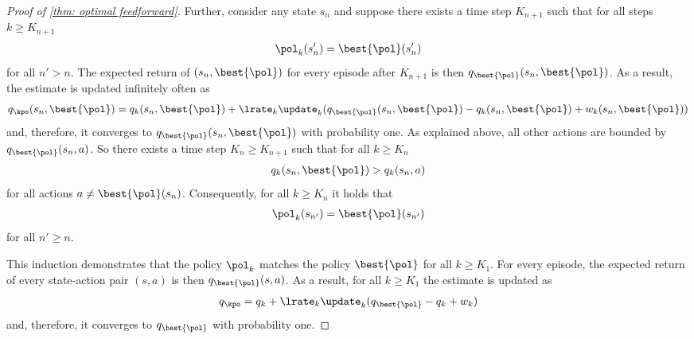 \begin{proof}[Proof of \autoref{thm: optimal feedforward}]
Further, consider any state $s_n$ and suppose there exists a time step $K_{n+1}$ such that for all steps $k \geq K_{n+1}$
\begin{align*}
    \pol_k(s_n') = \best{\pol}(s_n')
\end{align*}
for all $n'>n$.
The expected return of $(s_n, \best{\pol})$ for every episode after $K_{n+1}$ is then $q_{\best{\pol}}(s_n, \best{\pol})$. As a result, the estimate is updated infinitely often as
\begin{align*}
    q_\kpo(s_n, \best{\pol})
    =
    q_k(s_n, \best{\pol})
    + \lrate_k \update_k ( q_{\best{\pol}}(s_n, \best{\pol}) - q_k(s_n, \best{\pol}) + w_k(s_n, \best{\pol}) ) 
\end{align*}
and, therefore, it converges to $q_{\best{\pol}}(s_n, \best{\pol})$ with probability one.
As explained above, all other actions are bounded by $q_{\best{\pol}}(s_n, a)$.
So there exists a time step $K_n \geq K_{n+1}$ such that for all $k \geq K_n$
\begin{align*}
    q_k(s_n, \best{\pol}) 
    > q_k(s_n, a) 
\end{align*}
for all actions $a \neq \best{\pol}(s_n)$.
Consequently, for all $k \geq K_n$ it holds that
\begin{align*}
    \pol_k(s_{n'}) = \best{\pol}(s_{n'})
\end{align*}
for all $n' \geq n$.

This induction demonstrates that the policy $\pol_k$ matches the policy $\best{\pol}$ for all $k \geq K_1$. For every episode, the expected return of every state-action pair $(s,a)$ is then $q_{\best{\pol}}(s,a)$. As a result, for all $k \geq K_1$ the estimate is updated as
\begin{align*}
    q_\kpo
    =
    q_k
    + \lrate_k \update_k ( q_{\best{\pol}} - q_k + w_k ) 
\end{align*}
and, therefore, it converges to $q_{\best{\pol}}$ with probability one.
\end{proof}